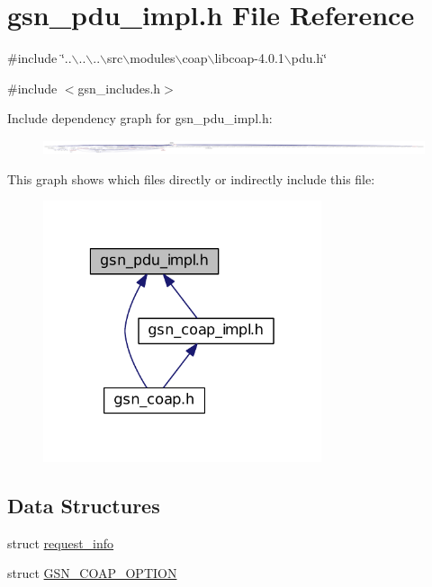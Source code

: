 \hypertarget{a00538}{
\section{gsn\_\-pdu\_\-impl.h File Reference}
\label{a00538}
}
{\ttfamily \#include \char`\"{}..$\backslash$..$\backslash$..$\backslash$src$\backslash$modules$\backslash$coap$\backslash$libcoap-\/4.0.1$\backslash$pdu.h\char`\"{}}\par
{\ttfamily \#include $<$gsn\_\-includes.h$>$}\par
Include dependency graph for gsn\_\-pdu\_\-impl.h:
\nopagebreak
\begin{figure}[H]
\begin{center}
\leavevmode
\includegraphics[width=400pt]{a00775}
\end{center}
\end{figure}
This graph shows which files directly or indirectly include this file:
\nopagebreak
\begin{figure}[H]
\begin{center}
\leavevmode
\includegraphics[width=232pt]{a00776}
\end{center}
\end{figure}
\subsection*{Data Structures}
\begin{DoxyCompactItemize}
\item 
struct \hyperlink{a00456}{request\_\-info}
\item 
struct \hyperlink{a00041}{GSN\_\-COAP\_\-OPTION}
\end{DoxyCompactItemize}

